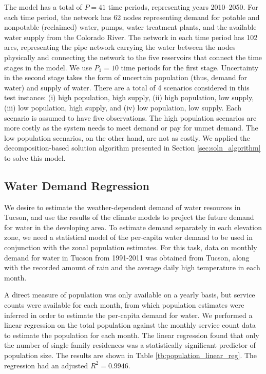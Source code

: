 \documentclass[opre,nonblindrev]{informs3} %
\begin{document}
The model has a total of $P = 41$ time periods, representing years 2010--2050. 
For each time period, the network has 62 nodes representing demand for potable and nonpotable (reclaimed) water, pumps, water treatment plants, and the available water supply from the Colorado River.
The network in each time period has 102 arcs, representing the pipe network carrying the water between the nodes physically and connecting the network to the five reservoirs that connect the time stages in the model.
We use $P_1 = 10$ time periods for the first stage.
Uncertainty in the second stage takes the form of uncertain population (thus, demand for water) and supply of water.
There are a total of 4 scenarios considered in this test instance: (i) high population, high supply, (ii) high population, low supply, (iii) low population, high supply, and (iv) low population, low supply.
Each scenario is assumed to have five observations.
The high population scenarios are more costly as the system needs to meet demand or pay for unmet demand.
The low population scenarios, on the other hand, are not as costly. 
We applied the decomposition-based solution algorithm presented in Section \ref{sec:soln_algorithm} to solve this model.%

\subsection{Water Demand Regression}

We desire to estimate the weather-dependent demand of water resources in Tucson, and use the results of the climate models to project the future demand for water in the developing area.
To estimate demand separately in each elevation zone, we need a statistical model of the per-capita water demand to be used in conjunction with the zonal population estimates.
For this task, data on monthly demand for water in Tucson from 1991-2011 was obtained from Tucson, along with the recorded amount of rain and the average daily high temperature in each month.

A direct measure of population was only available on a yearly basis, but service counts were available for each month, from which population estimates were inferred in order to estimate the per-capita demand for water.
We performed a linear regression on the total population against the monthly service count data to estimate the population for each month.
The linear regression found that only the number of single family residences was a statistically significant predictor of population size.
The results are shown in Table \ref{tb:population_linear_reg}.
The regression had an adjusted $R^2 = 0.9946$.
\end{document}
